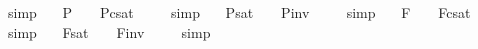 \begin{isabellebody}
\endisadelimproof
%
\isatagproof
{}\isamarkupfalse%
\ simp\ \isamarkupfalse%
%
\endisatagproof
{\isafoldproof}%
%
\isadelimproof
%
\endisadelimproof
%
\isamarkuptrue%
\isamarkupfalse%
\ \ {\isachardoublequoteopen}{\isacharbrackleft}{\isasymphi}\isactrlsup P{\isacharbrackright}\ {\isacharequal}\ {\isasymtop}\ {\isasymlongleftrightarrow}\ {\isacharbrackleft}{\isasymphi}\isactrlsup P{\isacharbrackright}\isactrlsup c\isactrlsup s\isactrlsup a\isactrlsup t\ {\isacharequal}\ {\isasymbottom}{\isachardoublequoteclose}%
\isadelimproof
\ %
\endisadelimproof
%
\isatagproof
{}\isamarkupfalse%
\ simp\ \isamarkupfalse%
%
\endisatagproof
{\isafoldproof}%
%
\isadelimproof
%
\endisadelimproof
\isanewline
{}\isamarkupfalse%
\ \ {\isachardoublequoteopen}{\isacharbrackleft}{\isasymphi}\isactrlsup P{\isacharbrackright}\isactrlsup s\isactrlsup a\isactrlsup t\ {\isacharequal}\ {\isasymtop}\ {\isasymlongleftrightarrow}\ {\isacharbrackleft}{\isasymphi}\isactrlsup P{\isacharbrackright}\isactrlsup i\isactrlsup n\isactrlsup v\ {\isacharequal}\ {\isasymbottom}{\isachardoublequoteclose}%
\isadelimproof
\ %
\endisadelimproof
%
\isatagproof
{}\isamarkupfalse%
\ simp\ \isamarkupfalse%
%
\endisatagproof
{\isafoldproof}%
%
\isadelimproof
%
\endisadelimproof
\isanewline
{}\isamarkupfalse%
\ \ {\isachardoublequoteopen}{\isacharbrackleft}{\isasymphi}\isactrlsup F{\isacharbrackright}\ {\isacharequal}\ {\isasymtop}\ {\isasymlongleftrightarrow}\ {\isacharbrackleft}{\isasymphi}\isactrlsup F{\isacharbrackright}\isactrlsup c\isactrlsup s\isactrlsup a\isactrlsup t\ {\isacharequal}\ {\isasymbottom}{\isachardoublequoteclose}%
\isadelimproof
\ %
\endisadelimproof
%
\isatagproof
{}\isamarkupfalse%
\ simp\ \isamarkupfalse%
%
\endisatagproof
{\isafoldproof}%
%
\isadelimproof
%
\endisadelimproof
\isanewline
{}\isamarkupfalse%
\ \ {\isachardoublequoteopen}{\isacharbrackleft}{\isasymphi}\isactrlsup F{\isacharbrackright}\isactrlsup s\isactrlsup a\isactrlsup t\ {\isacharequal}\ {\isasymtop}\ {\isasymlongleftrightarrow}\ {\isacharbrackleft}{\isasymphi}\isactrlsup F{\isacharbrackright}\isactrlsup i\isactrlsup n\isactrlsup v\ {\isacharequal}\ {\isasymbottom}{\isachardoublequoteclose}%
\isadelimproof
\ %
\endisadelimproof
%
\isatagproof
{}\isamarkupfalse%
\ simp\ \isamarkupfalse%
%
\endisatagproof
{\isafoldproof}%
%
\isadelimproof

\end{isabellebody}
